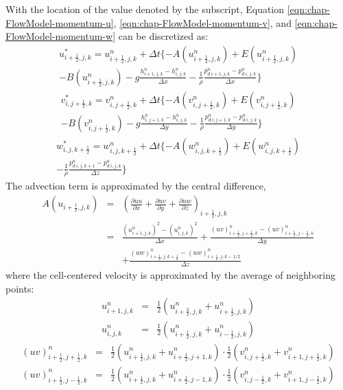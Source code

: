 With the location of the value denoted by the subscript, Equation \ref{eqn:chap-FlowModel-momentum-u}, \ref{eqn:chap-FlowModel-momentum-v}, and \ref{eqn:chap-FlowModel-momentum-w} can be discretized as:
\begin {eqnarray}
u_{i+ \frac{1}{2},j,k}^{*} = u_{i+ \frac{1}{2},j,k}^{n}+ \Delta t
\{ -A(u_{i+ \frac{1}{2},j,k}^n)+E(u_{i+ \frac{1}{2},j,k}^n) \nonumber \\
-B(u_{i+
\frac{1}{2},j,k}^n)-g\frac{h_{i+1,j,k}^n-h_{i,j,k}^n}{\Delta x}
-\frac{1}{\rho}\frac{p_{d \ i+1,j,k}^n-p_{d \ i,j,k}^n}{ \Delta x}
\}
\end{eqnarray}
\begin {eqnarray}
v_{i,j+ \frac{1}{2},k}^{*} = v_{i,j+ \frac{1}{2},k}^{n}+ \Delta t
\{ -A(v_{i,j+ \frac{1}{2},k}^n)+E(v_{i,j+ \frac{1}{2},k}^n) \nonumber \\
-B(v_{i,j+
\frac{1}{2},k}^n)-g\frac{h_{i,j+1,k}^n-h_{i,j,k}^n}{\Delta y}
-\frac{1}{\rho}\frac{p_{d \ i,j+1,k}^n-p_{d \ i,j,k}^n}{ \Delta y}
\}
\end{eqnarray}
\begin {eqnarray}
w_{i,j,k+ \frac{1}{2}}^{*} = w_{i,j,k+ \frac{1}{2}}^{n}+ \Delta t
\{ -A(w_{i,j,k+ \frac{1}{2}}^n)+E(w_{i,j,k+ \frac{1}{2}}^n) \nonumber \\
-\frac{1}{\rho}\frac{p_{d \ i,j,k+1}^n-p_{d \ i,j,k}^n}{ \Delta z}
\}
\end{eqnarray}
The advection term is approximated by the central difference,
\begin{eqnarray}
A(u_{i+ \frac{1}{2} ,j,k})&=&( \frac{\partial uu}{\partial x} +  \frac{\partial
uv}{\partial y}+\frac{\partial uw}{\partial z})_{i+ \frac{1}{2} ,j, k}\nonumber\\
&=&\frac{(u^n_{i+1,j,k})^2-(u^n_{i,j,k})^2}{\Delta
x}+\frac{(uv)^n_{i+ \frac{1}{2} ,j+ \frac{1}{2} ,k}-(uv)^n_{i+
\frac{1}{2} ,j- \frac{1}{2} ,k}}{\Delta
y}\nonumber \\
& & + \frac{(uw)^n_{i+ \frac{1}{2} ,j,k + \frac{1}{2}} -(uw)^n_{i+
\frac{1}{2} ,j,k-1/2}}{\Delta z}
\end{eqnarray}
where the cell-centered velocity is approximated by the average of
neighboring points:
\begin{eqnarray*}
u^n_{i+1,j,k}&=&\frac{1}{2}(u^n_{i + \frac{3}{2},j,k}+u^n_{i+ \frac{1}{2} ,j,k})\\
u^n_{i,j,k}&=&\frac{1}{2}(u^n_{i+ \frac{1}{2} ,j,k}+u^n_{i-
\frac{1}{2} ,j,k})
\end{eqnarray*}
\begin{eqnarray*}
(uv)^n_{i+ \frac{1}{2} ,j+ \frac{1}{2} ,k}&=&\frac{1}{2}(u^n_{i+
\frac{1}{2} ,j,k}+u^n_{i+ \frac{1}{2} ,j+1,k})
\cdot \frac{1}{2}(v^n_{i,j+ \frac{1}{2} ,k}+v^n_{i+1,j+ \frac{1}{2} ,k})\\
(uv)^n_{i+ \frac{1}{2} ,j- \frac{1}{2} ,k}&=&\frac{1}{2}(u^n_{i+
\frac{1}{2} ,j,k}+u^n_{i+ \frac{1}{2} ,j-1,k}) \cdot
\frac{1}{2}(v^n_{i,j- \frac{1}{2} ,k}+v^n_{i+1,j- \frac{1}{2} ,k})
\end{eqnarray*}
